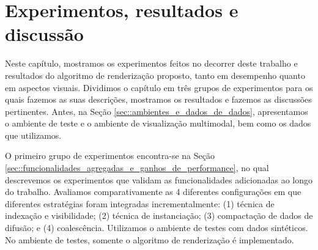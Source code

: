 \chapter{Experimentos, resultados e discussão}
\label{sec::experimentos}

Neste capítulo, mostramos os experimentos feitos no decorrer deste trabalho e resultados do algoritmo de renderização proposto, tanto em desempenho quanto em aspectos visuais.
Dividimos o capítulo em três grupos de experimentos para os quais fazemos as suas descrições, mostramos os resultados e fazemos as discussões pertinentes.
 Antes, na Seção \ref{sec::ambientes_e_dados_de_dados}, apresentamos o ambiente de teste e o ambiente de visualização multimodal, bem como os dados que utilizamos. 



 O primeiro grupo de experimentos encontra-se na Seção \ref{sec::funcionalidades_agregadas_e_ganhos_de_performance}, no qual descrevemos os experimentos que validam as funcionalidades adicionadas ao longo do trabalho. Avaliamos comparativamente as 4 diferentes configurações em que diferentes estratégias foram integradas incrementalmente: (1) técnica de indexação e visibilidade; (2) técnica de instanciação; (3) compactação de dados de difusão; e (4) coalescência. Utilizamos o ambiente de testes com dados sintéticos. No ambiente de testes, somente o algoritmo de renderização é implementado.
 
